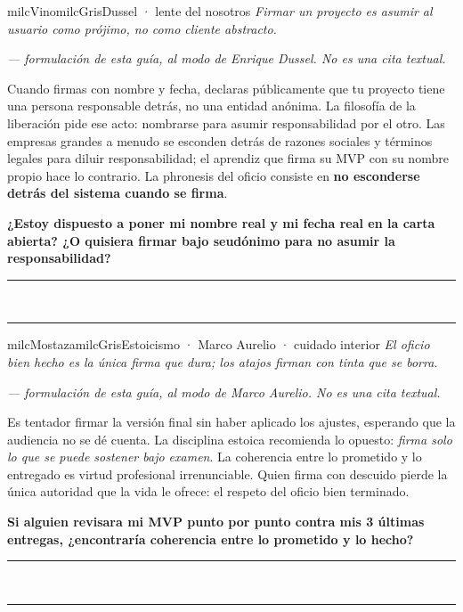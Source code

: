 \documentclass[11pt,letterpaper]{article}
\newcommand{\linead}[1]{\noindent\color{milcLinea}\rule{#1}{0.5pt}\color{milcNegro}}
\begin{document}
\begin{softbox}{milcVino}{milcGris}{Dussel · lente del nosotros}
\textit{Firmar un proyecto es asumir al usuario como prójimo, no como cliente abstracto.}

{\footnotesize\itshape\color{milcNegro!70}--- formulación de esta guía, al modo de Enrique Dussel. No es una cita textual.}

Cuando firmas con nombre y fecha, declaras públicamente que tu proyecto tiene una persona responsable detrás, no una entidad anónima. La filosofía de la liberación pide ese acto: nombrarse para asumir responsabilidad por el otro. Las empresas grandes a menudo se esconden detrás de razones sociales y términos legales para diluir responsabilidad; el aprendiz que firma su MVP con su nombre propio hace lo contrario. La phronesis del oficio consiste en \textbf{no esconderse detrás del sistema cuando se firma}.

\textbf{¿Estoy dispuesto a poner mi nombre real y mi fecha real en la carta abierta? ¿O quisiera firmar bajo seudónimo para no asumir la responsabilidad?}
\end{softbox}
\linead{\linewidth}\\[1mm]
\linead{\linewidth}

\begin{softbox}{milcMostaza}{milcGris}{Estoicismo · Marco Aurelio · cuidado interior}
\textit{El oficio bien hecho es la única firma que dura; los atajos firman con tinta que se borra.}

{\footnotesize\itshape\color{milcNegro!70}--- formulación de esta guía, al modo de Marco Aurelio. No es una cita textual.}

Es tentador firmar la versión final sin haber aplicado los ajustes, esperando que la audiencia no se dé cuenta. La disciplina estoica recomienda lo opuesto: \emph{firma solo lo que se puede sostener bajo examen}. La coherencia entre lo prometido y lo entregado es virtud profesional irrenunciable. Quien firma con descuido pierde la única autoridad que la vida le ofrece: el respeto del oficio bien terminado.

\textbf{Si alguien revisara mi MVP punto por punto contra mis 3 últimas entregas, ¿encontraría coherencia entre lo prometido y lo hecho?}
\end{softbox}
\linead{\linewidth}\\[1mm]
\linead{\linewidth}
\end{document}
